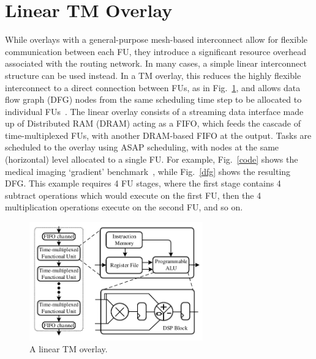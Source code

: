 \section{Linear TM Overlay}
\label{ch3_arch}

While overlays with a general-purpose mesh-based interconnect allow for flexible communication between each FU, they introduce a significant resource overhead associated with the routing network. 
In many cases, a simple linear interconnect structure can be used instead. In a TM overlay, this reduces the highly flexible interconnect to a direct connection between FUs, as in Fig.~\ref{pipelines}, and allows data flow graph (DFG) nodes from the same scheduling time step to be allocated to individual FUs~\cite{li2016area}.
The linear overlay consists of a streaming data interface made up of Distributed RAM (DRAM) acting as a FIFO, which feeds the cascade of time-multiplexed FUs, with another DRAM-based FIFO at the output.
Tasks are scheduled to the overlay using ASAP scheduling, with nodes at the same (horizontal) level allocated to a single FU.
For example, Fig.~\ref{code} shows the medical imaging `gradient' benchmark~\cite{cong2014fully}, while Fig.~\ref{dfg} shows the resulting DFG.
This example requires 4 FU stages, where the first stage contains 4 subtract operations which would execute on the first FU, then the 4 multiplication operations execute on the second FU, and so on.


\begin{figure}[b]
	\centering
	\includegraphics[width=7.5cm]{figures/pipelines_new.pdf}
	\caption{A linear TM overlay.}
	\label{pipelines}
\end{figure}

